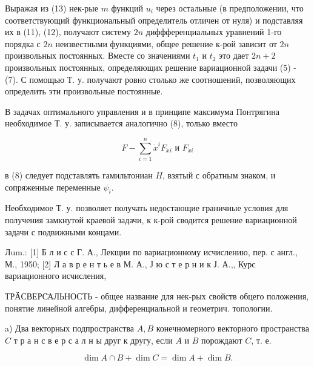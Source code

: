 \documentclass[10pt]{article}
\begin{document}
Выражая из (13) нек-рые $m$ функций $u_{i}$ через остальные (в предположении, что соответствующий функциональный определитель отличен от нуля) и подставляя их в (11), (12), получают систему $2 n$ диффференциальных уравнений 1-го порядка с $2 n$ неизвестными функциями, общее решение к-рой зависит от $2 n$ произвольных постоянных. Вместе со значениями $t_{1}$ и $t_{2}$ это дает $2 n+2$ произвольных постоянных, определяющих решение вариационной задачи (5) - (7). С помощью Т. у. получают ровно столько же соотношений, позволяющих определить эти произвольные постоянные.



В задачах оптимального управления и в принципе максимума Понтрягина необходимое Т. у. записывается аналогично (8), только вместо



\[

F-\sum_{i=1}^{n} \dot{x}^{i} F_{\dot{x} i} \text { и } F_{\dot{x} i}

\]



в (8) следует подставлять гамильтониан $H$, взятый с обратным знаком, и сопряженные переменные $\psi_{i}$.



Необходимое Т. у. позволяет получать недостающие граничные условия для получения замкнутой краевой задачи, к к-рой сводится решение вариационной задачи с подвижными концами.



Лum.: [1] Б л и с с Г. А., Лекщии по вариационному исчислению, пер. с англ., М., 1950; [2] Л а в р е н т ь е в М. А., Ј ю с т е р н и к Ј. А.,, Курс вариационного исчисления,



ТРӒСВЕРС̈АЛЬНОСТЬ - общее название для нек-рых свойств обцего положения, понятие линейной алгебры, дифференциальной и геометрич. топологии.



a) Два векторных подпространства $A, B$ конечномерного векторного пространства $C$ т р а н с в е р с а л н ы друг к другу, если $A$ и $B$ порождают $C$, т. е.



\[

\operatorname{dim} A \cap B+\operatorname{dim} C=\operatorname{dim} A+\operatorname{dim} B .

\]
\end{document}
